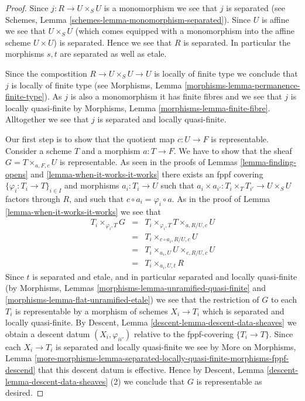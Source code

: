 \begin{proof}
Since $j : R \to U \times_S U$ is a monomorphism we see that $j$ is separated
(see Schemes, Lemma \ref{schemes-lemma-monomorphism-separated}).
Since $U$ is affine we see that $U \times_S U$
(which comes equipped with a monomorphism into the affine scheme
$U \times U$) is separated. Hence we see that $R$ is separated.
In particular the morphisms $s, t$ are separated as well as etale.

\medskip\noindent
Since the compostition $R \to U \times_S U \to U$ is
locally of finite type we conclude that
$j$ is locally of finite type (see
Morphisms, Lemma \ref{morphisms-lemma-permanence-finite-type}).
As $j$ is also a monomorphism it has finite fibres and
we see that $j$ is locally quasi-finite by
Morphisms, Lemma \ref{morphisms-lemma-finite-fibre}.
Alltogether we see that $j$ is separated and locally quasi-finite.

\medskip\noindent
Our first step is to show that the quotient map
$c : U \to F$ is representable.
Consider a scheme $T$ and a morphism $a : T \to F$.
We have to show that the sheaf $G = T \times_{a, F, c} U$
is representable.
As seen in the proofs of Lemmas \ref{lemma-finding-opens} and
\ref{lemma-when-it-works-it-works} there exists an fppf covering
$\{\varphi_i : T_i \to T\}_{i \in I}$ and morphisms $a_i : T_i \to U$
such that $a_i \times a_{i'} : T_i \times_T T_{i'} \to U\times_S U$
factors through $R$, and such that $c \circ a_i = \varphi_i \circ a$.
As in the proof of Lemma \ref{lemma-when-it-works-it-works} we see that
\begin{eqnarray*}
T_i \times_{\varphi_i, T} G & = &
T_i \times_{\varphi_i, T} T \times_{a, R/U, c} U \\
& = & T_i \times_{c \circ a_i, R/U, c} U \\
& = & T_i \times_{a_i, U} U \times_{c, R/U, c} U \\
& = & T_i \times_{a_i, U, t} R
\end{eqnarray*}
Since $t$ is separated and etale, and in particular
separated and locally quasi-finite (by Morphisms, Lemmas
\ref{morphisms-lemma-unramified-quasi-finite} and
\ref{morphisms-lemma-flat-unramified-etale})
we see that the restriction
of $G$ to each $T_i$ is representable by a morphism of schemes
$X_i \to T_i$ which is separated and locally quasi-finite. By
Descent, Lemma \ref{descent-lemma-descent-data-sheaves}
we obtain a descent datum $(X_i, \varphi_{ii'})$ relative
to the fppf-covering $\{T_i \to T\}$. Since each
$X_i \to T_i$ is separated and locally quasi-finite we see by
More on Morphisms, Lemma
\ref{more-morphisms-lemma-separated-locally-quasi-finite-morphisms-fppf-descend}
that this descent datum is effective.
Hence by
Descent, Lemma \ref{descent-lemma-descent-data-sheaves} (2)
we conclude that $G$ is representable as desired.


\end{proof}
